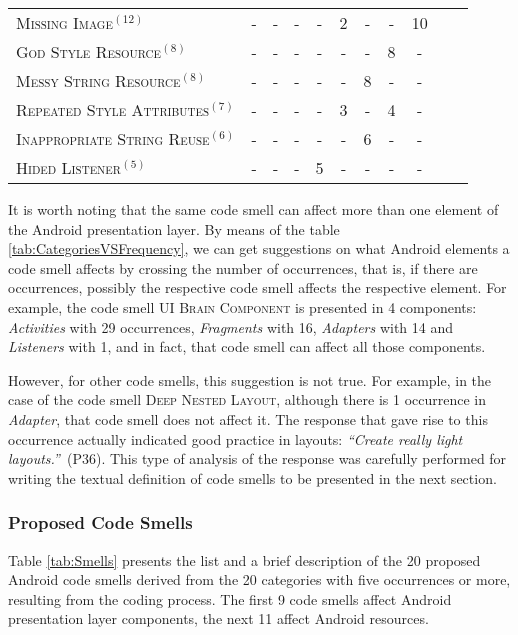 \begin{table*}[!htb]
\begin{tabular}{@{}p{7cm}@{}cccccccccp{3cm}}
\textsc{Missing Image}$^{(12)}$                & -   & -   & -   & -   & 2    & -   & -   & 10 &  \\
\textsc{God Style Resource}$^{(8)}$         & -   & -   & -   & -   & -    & -   & 8   & -  &  \\
\textsc{Messy String Resource}$^{(8)}$     & -   & -   & -   & -   & -    & 8   & -   & -  &  \\
\textsc{Repeated Style Attributes}$^{(7)}$   & -   & -   & -   & -   & 3    & -   & 4   & -  &  \\
\textsc{Inappropriate String Reuse}$^{(6)}$      & -   & -   & -   & -   & -    & 6   & -   & -  &  \\
\textsc{Hided Listener}$^{(5)}$              & -   & -   & -   & 5   & -    & -   & -   & -  &  \\
\bottomrule
\end{tabular}
\label{tab:CategoriesVSFrequency}
\end{table*}

It is worth noting that the same code smell can affect more than one element of the Android presentation layer. By means of the table \ref{tab:CategoriesVSFrequency}, we can get suggestions on what Android elements a code smell affects by crossing the number of occurrences, that is, if there are occurrences, possibly the respective code smell affects the respective element. For example, the code smell \textsc{\small UI Brain Component} is presented in 4 components: \textit{Activities} with 29 occurrences, \textit{Fragments} with 16, \textit{Adapters} with 14 and \textit{Listeners} with 1, and in fact, that code smell can affect all those components.

However, for other code smells, this suggestion is not true. For example, in the case of the code smell \textsc{\small Deep Nested Layout}, although there is 1 occurrence in \textit{Adapter}, that code smell does not affect it. The response that gave rise to this occurrence actually indicated good practice in layouts: \textit{``Create really light layouts.''}~(P36). This type of analysis of the response was carefully performed for writing the textual definition of code smells to be presented in the next section.


\subsubsection{Proposed Code Smells}
\label{phase1-code-smells-derivation}

Table \ref{tab:Smells} presents the list and a brief description of the 20 proposed Android code smells derived from the 20 categories with five occurrences or more, resulting from the coding process. The first 9 code smells affect Android presentation layer components, the next 11 affect Android resources.

